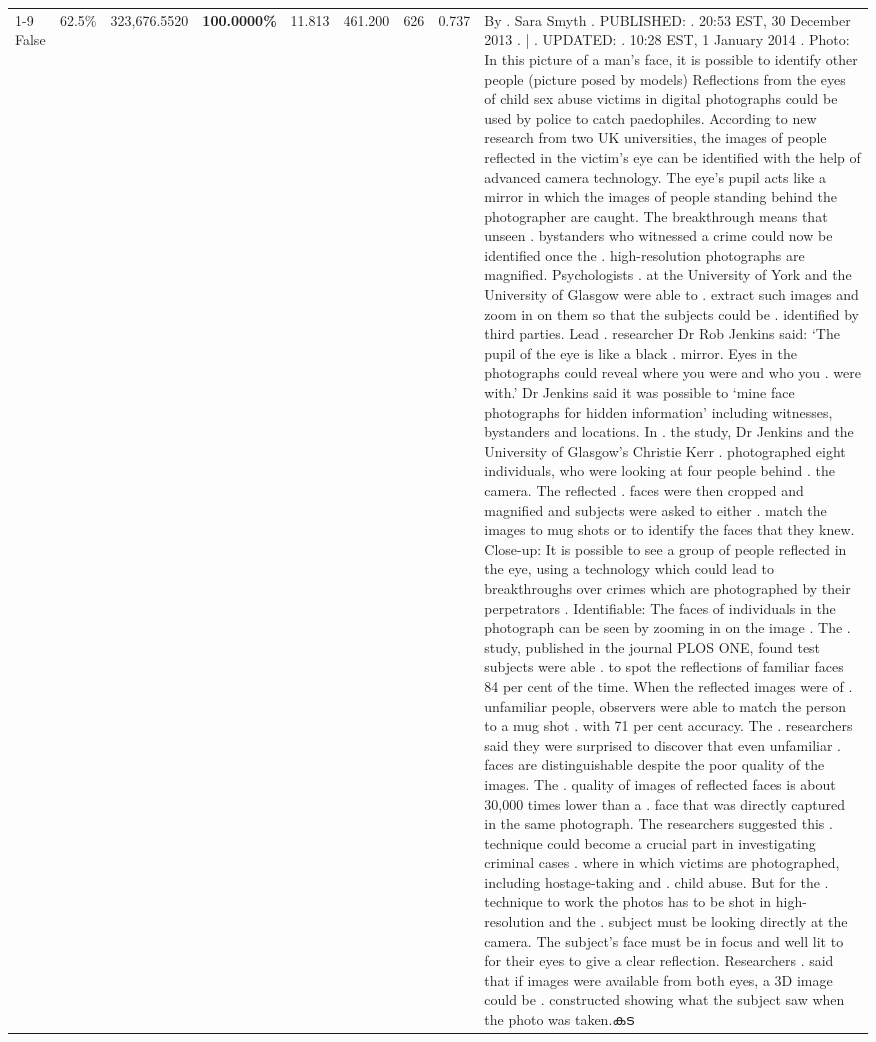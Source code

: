 \begin{table}[H]
\begin{tabular}{lllrlllll}
\cline{1-9}
False & 62.5\% & 323,676.5520 & \bfseries \color{red} 100.0000\% & 11.813 & 461.200 & 626 & 0.737 & By . Sara Smyth . PUBLISHED: . 20:53 EST, 30 December 2013 . | . UPDATED: . 10:28 EST, 1 January 2014 . Photo: In this picture of a man's face, it is possible to identify other people (picture posed by models) Reflections from the eyes of child sex abuse victims in digital photographs could be used by police to catch paedophiles. According to new research from two UK universities, the images of people reflected in the victim's eye can be identified with the help of advanced camera technology. The eye's pupil acts like a mirror in which the images of people standing behind the photographer are caught. The breakthrough means that unseen . bystanders who witnessed a crime could now be identified once the . high-resolution photographs are magnified. Psychologists . at the University of York and the University of Glasgow were able to . extract such images and zoom in on them so that the subjects could be . identified by third parties. Lead . researcher Dr Rob Jenkins said: ‘The pupil of the eye is like a black . mirror. Eyes in the photographs could reveal where you were and who you . were with.' Dr Jenkins said it was possible to ‘mine face photographs for hidden information' including witnesses, bystanders and locations. In . the study, Dr Jenkins and the University of Glasgow's Christie Kerr . photographed eight individuals, who were looking at four people behind . the camera. The reflected . faces were then cropped and magnified and subjects were asked to either . match the images to mug shots or to identify the faces that they knew. Close-up: It is possible to see a group of people reflected in the eye, using a technology which could lead to breakthroughs over crimes which are photographed by their perpetrators . Identifiable: The faces of individuals in the photograph can be seen by zooming in on the image . The . study, published in the journal PLOS ONE, found test subjects were able . to spot the reflections of familiar faces 84 per cent of the time. When the reflected images were of . unfamiliar people, observers were able to match the person to a mug shot . with 71 per cent accuracy. The . researchers said they were surprised to discover that even unfamiliar . faces are distinguishable despite the poor quality of the images. The . quality of images of reflected faces is about 30,000 times lower than a . face that was directly captured in the same photograph. The researchers suggested this . technique could become a crucial part in investigating criminal cases . where in which victims are photographed, including hostage-taking and . child abuse. But for the . technique to work the photos has to be shot in high-resolution and the . subject must be looking directly at the camera. The subject's face must be in focus and well lit to for their eyes to give a clear reflection. Researchers . said that if images were available from both eyes, a 3D image could be . constructed showing what the subject saw when the photo was taken.കട \\

\end{tabular}
\end{table}
